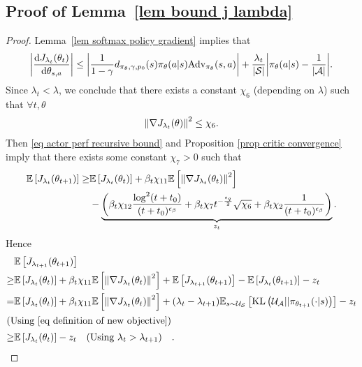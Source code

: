 \documentclass[twoside,11pt]{article}
\newcommand{\fS}{\mathcal{S}}
\newcommand{\fA}{\mathcal{A}}
\newcommand{\fU}{\mathcal{U}}
\newcommand{\E}{\mathbb{E}}
\newcommand{\ns}{{|\fS|}}
\newcommand{\na}{{|\fA|}}
\newcommand{\kl}[2]{\text{KL}\left(#1||#2\right)}
\newcommand{\adv}{\text{Adv}}
\numberwithin{assucounter}{section}
\begin{document}
\subsection{Proof of Lemma~\ref{lem bound j lambda}}
\label{sec proof lem bound j lambda}
\lemboundjlambda*
\begin{proof}
  Lemma~\ref{lem softmax policy gradient} implies that 
  \begin{align}
    \abs{\dv{J_{\lambda_t}(\theta_t)}{\theta_{s,a}}} \leq \abs{\frac{1}{1 - \gamma} d_{\pi_\theta, \gamma, p_0}(s) \pi_\theta(a|s) {\adv_{\pi_\theta}(s, a)}} + \frac{\lambda_t}{\ns} \abs{\pi_\theta(a | s) - \frac{1}{\na}}.
  \end{align}
  Since $\lambda_t < \lambda$,
  we conclude that
  there exists a constant $\chi_6$ (depending on $\lambda$) such that $\forall t, \theta$
  \begin{align}
    \norm{\nabla J_{\lambda_t}(\theta)}^2 \leq \chi_6.
  \end{align}
  Then \eqref{eq actor perf recursive bound} and Proposition \ref{prop critic convergence} imply that there exists some constant $\chi_7 > 0$ such that
\begin{align}
  \E\left[J_{\lambda_t}(\theta_{t+1})\right] \geq& \E\left[J_{\lambda_t}(\theta_t)\right] + \beta_t \chi_{11} \E\left[\norm{\nabla J_{\lambda_t}(\theta_t)}^2\right] \\
  &-\underbrace{\left(\beta_t \chi_{12} \frac{\log^2(t+t_0)}{(t+t_0)^{\epsilon_\beta}} +\beta_t \chi_{7} t^{-\frac{\epsilon_q}{2}} \sqrt{\chi_6} + \beta_t \chi_2 \frac{1}{(t+t_0)^{\epsilon_\beta}}\right)}_{z_t}.
\end{align}
Hence 
\begin{align}
  &\E\left[J_{\lambda_{t+1}}(\theta_{t+1})\right] \\
  \geq& \E\left[J_{\lambda_t}(\theta_t)\right] + \beta_t \chi_{11} \E\left[\norm{\nabla J_{\lambda_t}(\theta_t)}^2\right] + \E\left[J_{\lambda_{t+1}}(\theta_{t+1})\right] - \E\left[J_{\lambda_t}(\theta_{t+1})\right] - z_t \\
  = & \E\left[J_{\lambda_t}(\theta_t)\right] + \beta_t \chi_{11} \E\left[\norm{\nabla J_{\lambda_t}(\theta_t)}^2\right] + (\lambda_t - \lambda_{t+1}) \E_{s\sim\fU_\fS}\left[\kl{\fU_\fA}{\pi_{\theta_{t+1}}(\cdot|s)}\right] - z_t \\
  \intertext{\hfill (Using \eqref{eq definition of new objective})}
  \geq & \E\left[J_{\lambda_t}(\theta_t)\right] - z_t \qq{(Using $\lambda_t > \lambda_{t+1}$)}.
\end{align}

\end{proof}
\end{document}
